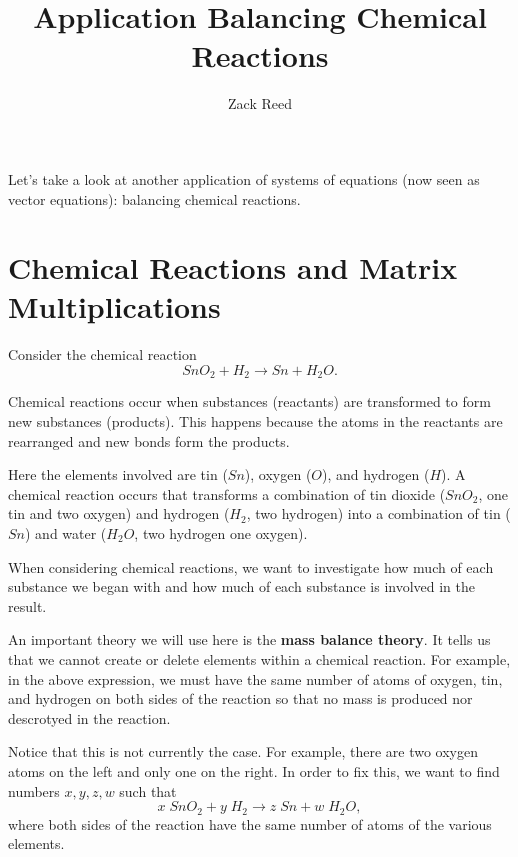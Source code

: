\documentclass{ximera}
\author{Zack Reed} %
\title{Application Balancing Chemical Reactions}
\begin{document}
\begin{abstract}

\end{abstract}
\maketitle

  Let's take a look at another application of systems of equations (now seen as vector equations): balancing chemical reactions.

  \section*{Chemical Reactions and Matrix Multiplications}

 Consider
  the chemical reaction \begin{equation*}
    SnO_2+H_2\rightarrow Sn+H_2O.
  \end{equation*}

Chemical reactions occur when substances (reactants) are transformed to form new substances (products). This happens because the atoms in the reactants are rearranged and new bonds form the products. 

Here the elements involved are tin ($Sn$), oxygen ($O$), and hydrogen
($H$). A chemical reaction occurs that transforms a combination of tin
dioxide ($SnO_2$, one tin and two oxygen) and hydrogen ($H_2$, two hydrogen) into a combination of tin
($Sn$) and water ($H_2O$, two hydrogen one oxygen). 

When considering chemical reactions, we
want to investigate how much of each substance we began with and how
much of each substance is involved in the result.

An important theory we will use here is the \textbf{mass balance theory}. It
tells us that we cannot create or delete elements within a chemical
reaction. For example, in the above expression, we must have the same
number of atoms of oxygen, tin, and hydrogen on both sides of the
reaction so that no mass is produced nor descrotyed in the reaction. 

Notice that this is not currently the case.  For example,
there are two oxygen atoms on the left and only one on the right. In
order to fix this, we want to find numbers $x,y,z,w$ such that
\begin{equation*}
  x\;SnO_2+y\;H_2\rightarrow z\;Sn+w\;H_2O,
\end{equation*}
where both sides of the reaction have the same number of atoms of the
various elements.
\end{document}
